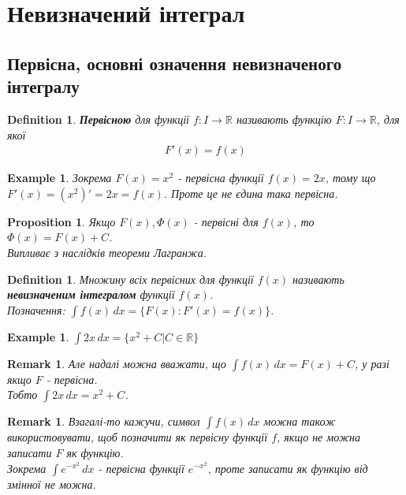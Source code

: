 \documentclass[a4paper, 10pt]{article}
\def\huge{\displaystyle}
\theoremstyle{theoremdd}
\theoremstyle{theoremdd}
\newtheorem{definition}[theorem]{Definition}
\theoremstyle{theoremdd}
\theoremstyle{theoremdd}
\newtheorem{example}[theorem]{Example}
\theoremstyle{theoremdd}
\newtheorem{proposition}[theorem]{Proposition}
\theoremstyle{theoremdd}
\newtheorem{remark}[theorem]{Remark}
\theoremstyle{theoremdd}
\theoremstyle{theoremdd}
\begin{document}

\tableofcontents
\newpage
\iffalse
\section{Невизначений інтеграл}
\subsection{Первісна, основні означення невизначеного інтегралу}

\begin{definition}
\textbf{Первісною} для функції $f: I \to \mathbb{R}$ називають функцію $F: I \to \mathbb{R}$, для якої
\begin{align*}
F'(x) = f(x)
\end{align*}
\end{definition}

\begin{example}
Зокрема $F(x) = x^2$ - первісна функції $f(x) = 2x$, тому що $F'(x) = (x^2)' = 2x = f(x)$. Проте це не єдина така первісна.
\end{example}

\begin{proposition}
Якщо $F(x), \Phi(x)$ - первісні для $f(x)$, то $\Phi(x) = F(x) + C$.\\
\textit{Випливає з наслідків теореми Лагранжа.}\\
\end{proposition}

\begin{definition}
Множину всіх первісних для функції $f(x)$ називають \textbf{невизначеним інтегралом} функції $f(x)$.\\
Позначення: $\huge \int f(x) \,dx = \{F(x): F'(x) = f(x)\}$.
\end{definition}

\begin{example}
$\huge\int 2x \,dx = \{x^2 + C | C \in \mathbb{R}\}$
\end{example}

\begin{remark}
Але надалі можна вважати, що $\huge \int f(x) \,dx = F(x) + C$, у разі якщо $F$ - первісна.\\
Тобто $\huge\int 2x\,dx = x^2 + C$.
\end{remark}

\begin{remark}
Взагалі-то кажучи, символ $\huge\int f(x)\,dx$ можна також використовувати, щоб позначити як первісну функції $f$, якщо не можна записати $F$ як функцію.\\
Зокрема $\huge\int e^{-x^2}\,dx$ - первісна функції $e^{-x^2}$, проте записати як функцію від змінної не можна.
\end{remark}
\end{document}
